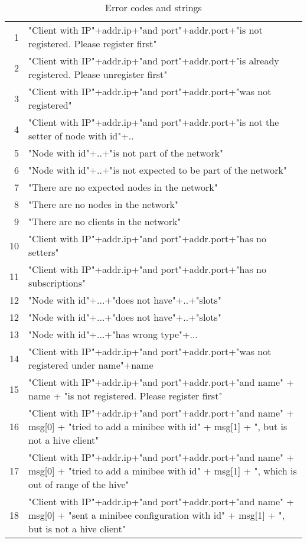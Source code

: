 \documentclass[letterpaper,10pt]{article}
\begin{document}
\begin{table}
\small
\begin{center}
\begin{tabular}{|rl|}
 \hline
  1 & "Client with IP"+addr.ip+"and port"+addr.port+"is not registered. Please register first" \\
  2 & "Client with IP"+addr.ip+"and port"+addr.port+"is already registered. Please unregister first" \\
  3 & "Client with IP"+addr.ip+"and port"+addr.port+"was not registered"  \\
  4 & "Client with IP"+addr.ip+"and port"+addr.port+"is not the setter of node with id"+..  \\
  5 & "Node with id"+..+"is not part of the network" \\
  6 & "Node with id"+..+"is not expected to be part of the network"  \\
  7 & "There are no expected nodes in the network" \\
  8 & "There are no nodes in the network"  \\
  9 & "There are no clients in the network"  \\
 10 & "Client with IP"+addr.ip+"and port"+addr.port+"has no setters"  \\
 11 & "Client with IP"+addr.ip+"and port"+addr.port+"has no subscriptions" \\
 12 & "Node with id"+...+"does not have"+..+"slots" \\
 12 & "Node with id"+...+"does not have"+..+"slots" \\
 13 & "Node with id"+...+"has wrong type"+... \\
 14 & "Client with IP"+addr.ip+"and port"+addr.port+"was not registered under name"+name \\
 15 & "Client with IP"+addr.ip+"and port"+addr.port+"and name" + name + "is not registered. Please register first" \\
 \hline
 16 & "Client with IP"+addr.ip+"and port"+addr.port+"and name" + msg[0] + "tried to add a minibee with id" + msg[1] + ", but is not a hive client"\\
 17 & "Client with IP"+addr.ip+"and port"+addr.port+"and name" + msg[0] + "tried to add a minibee with id" + msg[1] + ", which is out of range of the hive"\\
 18 & "Client with IP"+addr.ip+"and port"+addr.port+"and name" + msg[0] + "sent a minibee configuration with id" + msg[1] + ", but is not a hive client"\\
 \hline
 \end{tabular}
\end{center}
\caption{Error codes and strings}
\label{errorcodes}
\end{table}
\end{document}
